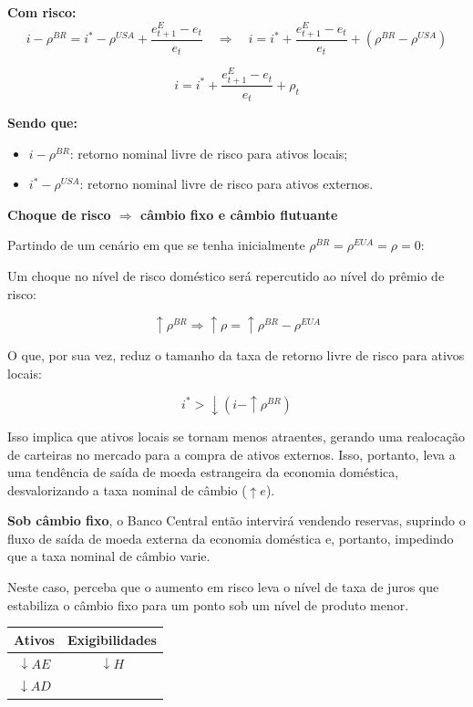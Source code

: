 \documentclass[a4paper,12pt]{article}[abntex2]
\begin{document}
\textbf{Com risco:}
\[
i - \rho^{BR} = i^* - \rho^{USA} + \frac{e_{t+1}^E - e_t}{e_t} 
\quad \Rightarrow \quad 
i = i^* + \frac{e_{t+1}^E - e_t}{e_t} + (\rho^{BR} - \rho^{USA})
\]

\[
i = i^* + \frac{e_{t+1}^E - e_t}{e_t} + \rho_t
\]

\textbf{Sendo que:}
\begin{itemize}
  \item $i - \rho^{BR}$: retorno nominal livre de risco para ativos locais;
  \item $i^* - \rho^{USA}$: retorno nominal livre de risco para ativos externos.
\end{itemize}

\textbf{Choque de risco $\Rightarrow$ câmbio fixo e câmbio flutuante}

Partindo de um cenário em que se tenha inicialmente $\rho^{BR} = \rho^{EUA} = \rho = 0$:

Um choque no nível de risco doméstico será repercutido ao nível do prêmio de risco:

\[
\uparrow \rho^{BR} \Rightarrow \uparrow \rho = \uparrow \rho^{BR} - \rho^{EUA}
\]

O que, por sua vez, reduz o tamanho da taxa de retorno livre de risco para ativos locais:

\[
i^* > \downarrow (i - \uparrow \rho^{BR})
\]

Isso implica que ativos locais se tornam menos atraentes, gerando uma realocação de carteiras no mercado para a compra de ativos externos. Isso, portanto, leva a uma tendência de saída de moeda estrangeira da economia doméstica, desvalorizando a taxa nominal de câmbio ($\uparrow e$).

\textbf{Sob câmbio fixo}, o Banco Central então intervirá vendendo reservas, suprindo o fluxo de saída de moeda externa da economia doméstica e, portanto, impedindo que a taxa nominal de câmbio varie.

Neste caso, perceba que o aumento em risco leva o nível de taxa de juros que estabiliza o câmbio fixo para um ponto sob um nível de produto menor.


\begin{center}
\begin{tabular}{|c|c|}
\hline
\textbf{Ativos} & \textbf{Exigibilidades} \\
\hline
$\downarrow AE$ & $\downarrow H$ \\
$\downarrow AD$ & \\
\hline
\end{tabular}
\end{center}
\end{document}
